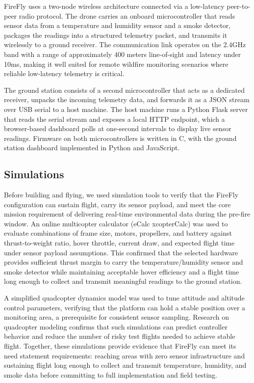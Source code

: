 \documentclass[journal, onecolumn]{IEEEtran}
\begin{document}
FireFly uses a two-node wireless architecture connected via a low-latency peer-to-peer radio protocol. The drone carries an onboard microcontroller that reads sensor data from a temperature and humidity sensor and a smoke detector, packages the readings into a structured telemetry packet, and transmits it wirelessly to a ground receiver. The communication link operates on the 2.4GHz band with a range of approximately 400 meters line-of-sight and latency under 10ms, making it well suited for remote wildfire monitoring scenarios where reliable low-latency telemetry is critical.

\vspace{0.5em}

The ground station consists of a second microcontroller that acts as a dedicated receiver, unpacks the incoming telemetry data, and forwards it as a JSON stream over USB serial to a host machine. The host machine runs a Python Flask server that reads the serial stream and exposes a local HTTP endpoint, which a browser-based dashboard polls at one-second intervals to display live sensor readings. Firmware on both microcontrollers is written in C, with the ground station dashboard implemented in Python and JavaScript.

\subsection{Simulations}

Before building and flying, we used simulation tools to verify that the FireFly configuration can sustain flight, carry its sensor payload, and meet the core mission requirement of delivering real-time environmental data during the pre-fire window. An online multicopter calculator (eCalc xcopterCalc) was used to evaluate combinations of frame size, motors, propellers, and battery against thrust-to-weight ratio, hover throttle, current draw, and expected flight time under sensor payload assumptions. This confirmed that the selected hardware provides sufficient thrust margin to carry the temperature/humidity sensor and smoke detector while maintaining acceptable hover efficiency and a flight time long enough to collect and transmit meaningful readings to the ground station.

\vspace{0.5em}

A simplified quadcopter dynamics model was used to tune attitude and altitude control parameters, verifying that the platform can hold a stable position over a monitoring area, a prerequisite for consistent sensor sampling. Research on quadcopter modeling confirms that such simulations can predict controller behavior and reduce the number of risky test flights needed to achieve stable flight. Together, these simulations provide evidence that FireFly can meet its need statement requirements: reaching areas with zero sensor infrastructure and sustaining flight long enough to collect and transmit temperature, humidity, and smoke data before committing to full implementation and field testing.
\end{document}
